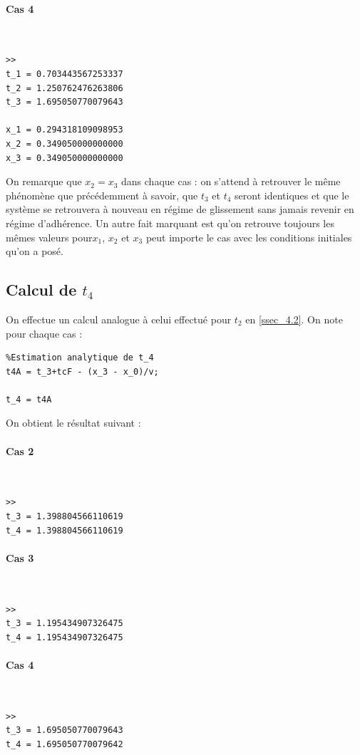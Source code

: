 \documentclass{article}
\begin{document}
\paragraph{Cas 4}
$ $ 
\begin{lstlisting}
>>
t_1 = 0.703443567253337
t_2 = 1.250762476263806
t_3 = 1.695050770079643

x_1 = 0.294318109098953
x_2 = 0.349050000000000
x_3 = 0.349050000000000
\end{lstlisting}

On remarque que $x_2=x_3$ dans chaque cas : on s'attend à retrouver le même phénomène que précédemment à savoir, que $t_3$ et $t_4$ seront identiques et que le système se retrouvera à nouveau en régime de glissement sans jamais revenir en régime d'adhérence. Un autre fait marquant est qu'on retrouve toujours les mêmes valeurs pour$x_1$, $x_2$ et $x_3$ peut importe le cas avec les conditions initiales qu'on a posé. 

\subsection{Calcul de $t_4$}
On effectue un calcul analogue à celui effectué pour $t_2$ en \ref{ssec_4.2}. On note pour chaque cas :

\begin{lstlisting}
%Estimation analytique de t_4 
t4A = t_3+tcF - (x_3 - x_0)/v;

t_4 = t4A
\end{lstlisting}

On obtient le résultat suivant :

\paragraph{Cas 2}
$ $
\begin{lstlisting}
>>
t_3 = 1.398804566110619
t_4 = 1.398804566110619
\end{lstlisting}

\paragraph{Cas 3}
$ $
\begin{lstlisting}
>>
t_3 = 1.195434907326475
t_4 = 1.195434907326475
\end{lstlisting}

\paragraph{Cas 4}
$ $
\begin{lstlisting}
>>
t_3 = 1.695050770079643
t_4 = 1.695050770079642
\end{lstlisting}
\end{document}
